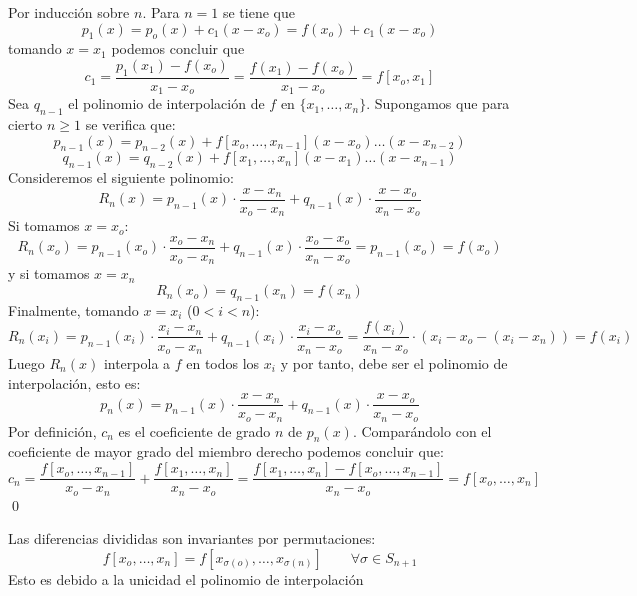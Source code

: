         \begin{dem}
        Por inducción sobre $n$. Para $n=1$ se tiene que
        $$p_1(x)=p_o(x)+c_1(x-x_o)=f(x_o)+c_1(x-x_o)$$
        tomando $x=x_1$ podemos concluir que
        $$c_1=\frac{p_1(x_1)-f(x_o)}{x_1-x_o}=\frac{f(x_1)-f(x_o)}{x_1-x_o}=f[x_o,x_1]$$
       Sea $q_{n-1}$ el polinomio de interpolación de $f$ en $\{x_1,\ldots,x_n\}$. Supongamos que para cierto $n\geq1$ se verifica que:
       $$p_{n-1}(x)=p_{n-2}(x)+f[x_o,\ldots,x_{n-1}](x-x_o)\ldots(x-x_{n-2})$$
       $$q_{n-1}(x)=q_{n-2}(x)+f[x_1,\ldots,x_n](x-x_1)\ldots(x-x_{n-1})$$
        Consideremos el siguiente polinomio:
        $$R_n(x)=p_{n-1}(x)\cdot\frac{x-x_n}{x_o-x_n}+q_{n-1}(x)\cdot\frac{x-x_o}{x_n-x_o}$$
        Si tomamos $x=x_o$:
        $$R_n(x_o)=p_{n-1}(x_o)\cdot\frac{x_o-x_n}{x_o-x_n}+q_{n-1}(x)\cdot\frac{x_o-x_o}{x_n-x_o}=p_{n-1}(x_o)=f(x_o)$$
        y si tomamos $x=x_n$
        $$R_n(x_o)=q_{n-1}(x_n)=f(x_n)$$
        Finalmente, tomando $x=x_i$ ($0<i<n$):
        $$R_n(x_i)=p_{n-1}(x_i)\cdot\frac{x_i-x_n}{x_o-x_n}+q_{n-1}(x_i)\cdot \frac{x_i-x_o}{x_n-x_o}=\frac{f(x_i)}{x_n-x_o}\cdot(x_i-x_o-(x_i-x_n))=f(x_i)$$
        Luego $R_n(x)$ interpola a $f$ en todos los $x_i$ y por tanto, debe ser el polinomio de interpolación, esto es:
        $$p_n(x)=p_{n-1}(x)\cdot\frac{x-x_n}{x_o-x_n}+q_{n-1}(x)\cdot\frac{x-x_o}{x_n-x_o}$$
        Por definición, $c_n$ es el coeficiente de grado $n$ de $p_n(x)$. Comparándolo con el coeficiente de mayor grado del miembro derecho podemos concluir que:
        $$c_n=\frac{f[x_o,\ldots,x_{n-1}]}{x_o-x_n}+\frac{f[x_1,\ldots,x_n]}{x_n-x_o}=\frac{f[x_1,\ldots,x_n]-f[x_o,\ldots,x_{n-1}]}{x_n-x_o}=f[x_o,\ldots,x_n]$$
        \qed\end{dem}
        \begin{cor}
        Las diferencias divididas son invariantes por permutaciones:
        $$f[x_o,\ldots,x_ n]=f[x_{\sigma(o)},\ldots,x_{\sigma(n)}]\qquad \forall\sigma\in S_{n+1}$$
        Esto es debido a la unicidad el polinomio de interpolación
        \end{cor}
        
